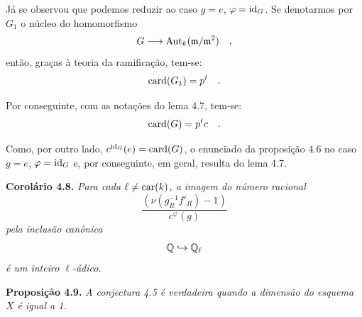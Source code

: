 \medskip

\begin{prooftext}
Já se observou que podemos reduzir ao caso $g = e$, $\varphi = \operatorname{id}_G$. Se denotarmos por $G_1$ o núcleo do homomorfismo
\[
G \longrightarrow \operatorname{Aut}_k(\mathfrak m/\mathfrak m^2) \quad ,
\]
então, graças à teoria da ramificação, tem-se:
\[
\operatorname{card}(G_1) = p^t \quad .
\]

Por conseguinte, com as notações do lema 4.7, tem-se:
\[
\operatorname{card}(G) = p^t c \quad .
\]

Como, por outro lado, $c^{\operatorname{id}_G}(e) = \operatorname{card}(G)$, o enunciado da proposição 4.6 no caso $g = e$, $\varphi = \operatorname{id}_G$ e, por conseguinte, em geral, resulta do lema 4.7.
\end{prooftext}

\medskip
\noindent
\textbf{Corolário 4.8.} \emph{Para cada $\ell \neq \operatorname{car}(k)$, a imagem do número racional
\[
\frac{(\nu(g_R^{-1}f'_R) - 1)}{c^\varphi(g)}
\]
pela inclusão canônica
\[
\mathbb Q \hookrightarrow \mathbb Q_\ell
\]
é um inteiro $\ell$-ádico.}

\medskip
\noindent
\textbf{Proposição 4.9.} \emph{A conjectura 4.5 é verdadeira quando a dimensão do esquema $X$ é igual a 1.}
